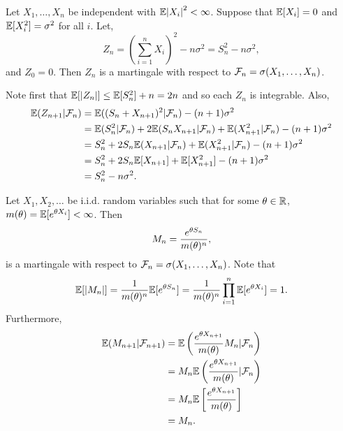 \begin{example}
    Let $X_1,\ldots, X_n$ be independent with ${\mathbb{E}}{\left\lvert X_i\right\rvert}^2 < \infty$. Suppose that ${\mathbb{E}}[X_i]=0$ and ${\mathbb{E}}[X_i^2]=\sigma^2$ for all $i$. Let,
    \[Z_n = \left(\sum_{i=1}^n X_i\right)^2-n\sigma^2 = S_n^2-n\sigma^2,\]
    and $Z_0=0$. Then $Z_n$ is a martingale with respect to ${\mathcal{F}}_n = \sigma(X_1,\ldots, X_n)$.

    Note first that ${\mathbb{E}}[{\left\lvert Z_n\right\rvert}] \le {\mathbb{E}}[S_n^2]+n =2n$ and so each $Z_n$ is integrable. Also,
    \begin{align*}
        {\mathbb{E}}(Z_{n+1}|{\mathcal{F}}_n)&={\mathbb{E}}((S_n+X_{n+1})^2|{\mathcal{F}}_n) - (n+1)\sigma^2\\
        &={\mathbb{E}}(S_n^2|{\mathcal{F}}_n) + 2{\mathbb{E}}(S_nX_{n+1}|{\mathcal{F}}_n)+{\mathbb{E}}(X_{n+1}^2|{\mathcal{F}}_n)-(n+1)\sigma^2\\
        &=S_n^2+2S_n{\mathbb{E}}(X_{n+1}|{\mathcal{F}}_n)+{\mathbb{E}}(X_{n+1}^2|{\mathcal{F}}_n)-(n+1)\sigma^2\\
        &=S_n^2+2S_n{\mathbb{E}}[X_{n+1}]+{\mathbb{E}}[X_{n+1}^2]-(n+1)\sigma^2\\
        &=S_n^2-n\sigma^2.
    \end{align*}
\end{example}
\begin{example}
    Let $X_1,X_2,\ldots$ be i.i.d. random variables such that for some ${\theta} \in {\mathbb R}$, $m({\theta}) ={\mathbb{E}}[e^{{\theta} X_i}] < \infty$. Then 
    \[M_n = \frac{e^{{\theta} S_n}}{m({\theta})^n},\]
    is a martingale with respect to ${\mathcal{F}}_n = \sigma(X_1,\ldots,X_n)$. Note that 
    \[{\mathbb{E}}[{\left\lvert M_n\right\rvert}] = \frac{1}{m({\theta})^n}{\mathbb{E}}[e^{{\theta} S_n}]=\frac{1}{m({\theta})^n}\prod_{i=1}^n {\mathbb{E}}[e^{{\theta} X_i}]=1.\]
    Furthermore,
    \begin{align*}
        {\mathbb{E}}(M_{n+1}|{\mathcal{F}}_{n+1}) &={\mathbb{E}}\left(\frac{e^{{\theta} X_{n+1}}}{m({\theta})}M_n|{\mathcal{F}}_n\right)\\
        &=M_n{\mathbb{E}}\left(\frac{e^{{\theta} X_{n+1}}}{m({\theta})}|{\mathcal{F}}_n\right)\\
        &=M_n{\mathbb{E}}\left[\frac{e^{{\theta} X_{n+1}}}{m({\theta})}\right]\\
        &=M_n.
    \end{align*}
\end{example}
